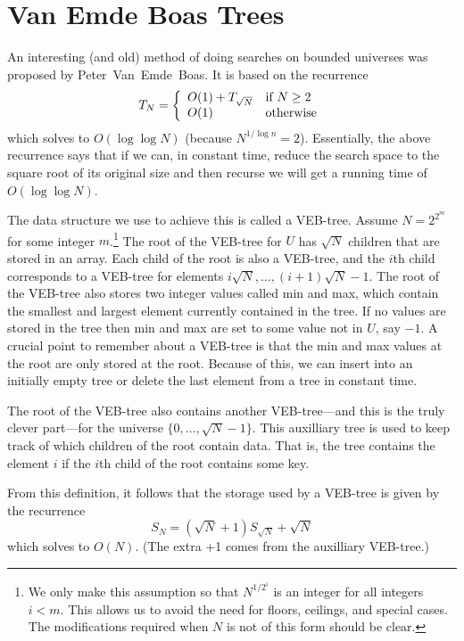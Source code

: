 \section{Van Emde Boas Trees}

An interesting (and old) method of doing searches on bounded universes
was proposed by Peter~Van~Emde~Boas.  It is based on the recurrence
\begin{equation}
  T_N = \left\{\begin{array}{ll}
	O(1)+ T_{\sqrt{N}} & \mbox{if $N\ge 2$} \\
	O(1)               & \mbox{otherwise} 
	\end{array}\right. \eqlabel{rootish}
\end{equation}
which solves to $O(\log\log N)$ (because $N^{1/\log n}=2$).
Essentially, the above recurrence says that if we can, in constant
time, reduce the search space to the square root of its original size
and then recurse we will get a running time of $O(\log\log N)$.

The data structure we use to achieve this is called a VEB-tree.
Assume $N=2^{2^m}$ for some integer $m$.\footnote{We only make this
assumption so that $N^{1/2^i}$ is an integer for all integers $i<m$.
This allows us to avoid the need for floors, ceilings, and special
cases.  The modifications required when $N$ is not of this form should
be clear.}  The root of the VEB-tree for $U$ has $\sqrt{N}$ children
that are stored in an array.  Each child of the root is also a
VEB-tree, and the $i$th child corresponds to a VEB-tree for elements
$i\sqrt{N},\ldots,(i+1)\sqrt{N}-1$.  The root of the VEB-tree also
stores two integer values called min and max, which contain the
smallest and largest element currently contained in the tree.  If no
values are stored in the tree then min and max are set to some value
not in $U$, say $-1$.  A crucial point to remember about a VEB-tree is
that the min and max values at the root are only stored at the root.
Because of this, we can insert into an initially empty tree or delete
the last element from a tree in constant time.

The root of the VEB-tree also contains another VEB-tree---and this is
the truly clever part---for the universe
$\{0,\ldots,\sqrt{N}-1\}$. This auxilliary tree is used to keep track
of which children of the root contain data.  That is, the tree
contains the element $i$ if the $i$th child of the root contains some
key.

From this definition, it follows that the storage used by a VEB-tree is given by the recurrence
\[
  S_N = (\sqrt{N}+1)S_{\sqrt{N}} + \sqrt{N}
\]
which solves to $O(N)$.  (The extra +1 comes from the auxilliary VEB-tree.)

